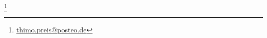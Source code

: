 \begin{titlepage}
    \begin{addmargin}[-1cm]{-3cm}
    \begin{center}
        \large

        \hfill

        \vfill

        \begingroup
            \color{CTtitle}\spacedallcaps{\myTitle} \\ \bigskip
        \endgroup

        \spacedlowsmallcaps{\myName}\footnote{\href{mailto:thimo.preis@posteo.de}{thimo.preis@posteo.de}}
        

        \vfill

        \myTime

        \vfill

    \end{center}
  \end{addmargin}
\end{titlepage}
